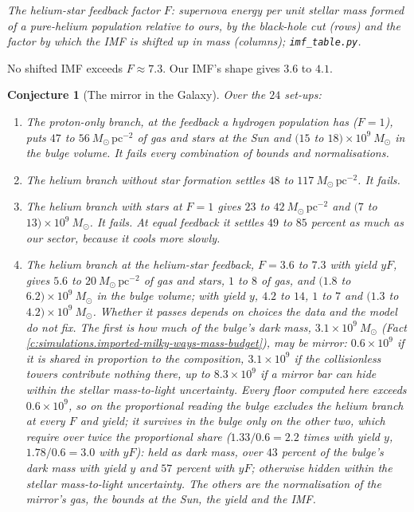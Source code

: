 \documentclass[11pt]{article}
\newtheorem{conjecture}[theorem]{Conjecture}
\theoremstyle{definition}
\theoremstyle{plain}
\providecommand{\Msun}{}\renewcommand{\Msun}{M_{\odot}}
\providecommand{\file}{}\renewcommand{\file}[1]{\texttt{#1}}
\begin{document}
\emph{The helium-star feedback factor $F$: supernova energy per unit stellar mass formed of a pure-helium population relative to ours, by the black-hole cut (rows) and the factor by which the IMF is shifted up in mass (columns); \file{imf\_table.py}.}

No shifted IMF exceeds $F \approx 7.3$. Our IMF's shape gives $3.6$ to $4.1$.

\begin{conjecture}[The mirror in the Galaxy]\label{c:simulations.mirror-galaxy}
Over the $24$ set-ups:
\begin{enumerate}
\item[(i)] The proton-only branch, at the feedback a hydrogen population has ($F = 1$), puts $47$ to $56\ \Msun\,\mathrm{pc^{-2}}$ of gas and stars at the Sun and $(15$ to $18) \times 10^{9}\ \Msun$ in the bulge volume. It fails every combination of bounds and normalisations.
\item[(ii)] The helium branch without star formation settles $48$ to $117\ \Msun\,\mathrm{pc^{-2}}$. It fails.
\item[(iii)] The helium branch with stars at $F = 1$ gives $23$ to $42\ \Msun\,\mathrm{pc^{-2}}$ and $(7$ to $13) \times 10^{9}\ \Msun$. It fails. At equal feedback it settles $49$ to $85$ percent as much as our sector, because it cools more slowly.
\item[(iv)] The helium branch at the helium-star feedback, $F = 3.6$ to $7.3$ with yield $yF$, gives $5.6$ to $20\ \Msun\,\mathrm{pc^{-2}}$ of gas and stars, $1$ to $8$ of gas, and $(1.8$ to $6.2) \times 10^{9}\ \Msun$ in the bulge volume; with yield $y$, $4.2$ to $14$, $1$ to $7$ and $(1.3$ to $4.2) \times 10^{9}\ \Msun$. Whether it passes depends on choices the data and the model do not fix. The first is how much of the bulge's dark mass, $3.1 \times 10^{9}\ \Msun$ (Fact \ref{c:simulations.imported-milky-ways-mass-budget}), may be mirror: $0.6 \times 10^{9}$ if it is shared in proportion to the composition, $3.1 \times 10^{9}$ if the collisionless towers contribute nothing there, up to $8.3 \times 10^{9}$ if a mirror bar can hide within the stellar mass-to-light uncertainty. Every floor computed here exceeds $0.6 \times 10^{9}$, so on the proportional reading the bulge excludes the helium branch at every $F$ and yield; it survives in the bulge only on the other two, which require over twice the proportional share ($1.33/0.6 = 2.2$ times with yield $y$, $1.78/0.6 = 3.0$ with $yF$): held as dark mass, over $43$ percent of the bulge's dark mass with yield $y$ and $57$ percent with $yF$; otherwise hidden within the stellar mass-to-light uncertainty. The others are the normalisation of the mirror's gas, the bounds at the Sun, the yield and the IMF.


\end{enumerate}
\end{conjecture}
\end{document}

